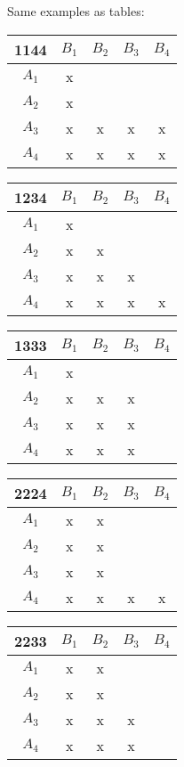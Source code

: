 \documentclass[a4paper]{article}
\begin{document}
Same examples as tables:\\
\begin{tabular}{c||c|c|c|c}
1144 & $B_1$ & $B_2$ & $B_3$ & $B_4$ \\\hline\hline
 $A_1$ & x & ~ & ~ & ~ \\
 $A_2$ & x & ~ & ~ & ~ \\
 $A_3$ & x & x & x & x \\
 $A_4$ & x & x & x & x \\
\end{tabular}
\hfill
\begin{tabular}{c||c|c|c|c}
1234 & $B_1$ & $B_2$ & $B_3$ & $B_4$ \\\hline\hline
 $A_1$ & x & ~ & ~ & ~ \\
 $A_2$ & x & x & ~ & ~ \\
 $A_3$ & x & x & x & ~ \\
 $A_4$ & x & x & x & x \\
\end{tabular}
\hfill
\begin{tabular}{c||c|c|c|c}
1333 & $B_1$ & $B_2$ & $B_3$ & $B_4$ \\\hline\hline
 $A_1$ & x & ~ & ~ & ~ \\
 $A_2$ & x & x & x & ~ \\
 $A_3$ & x & x & x & ~ \\
 $A_4$ & x & x & x & ~ \\
\end{tabular}

\begin{tabular}{c||c|c|c|c}
2224 & $B_1$ & $B_2$ & $B_3$ & $B_4$ \\\hline\hline
 $A_1$ & x & x & ~ & ~ \\
 $A_2$ & x & x & ~ & ~ \\
 $A_3$ & x & x & ~ & ~ \\
 $A_4$ & x & x & x & x \\
\end{tabular}
\hfill
\begin{tabular}{c||c|c|c|c}
2233 & $B_1$ & $B_2$ & $B_3$ & $B_4$ \\\hline\hline
 $A_1$ & x & x & ~ & ~ \\
 $A_2$ & x & x & ~ & ~ \\
 $A_3$ & x & x & x & ~ \\
 $A_4$ & x & x & x & ~ \\
\end{tabular}


~
\end{document}
